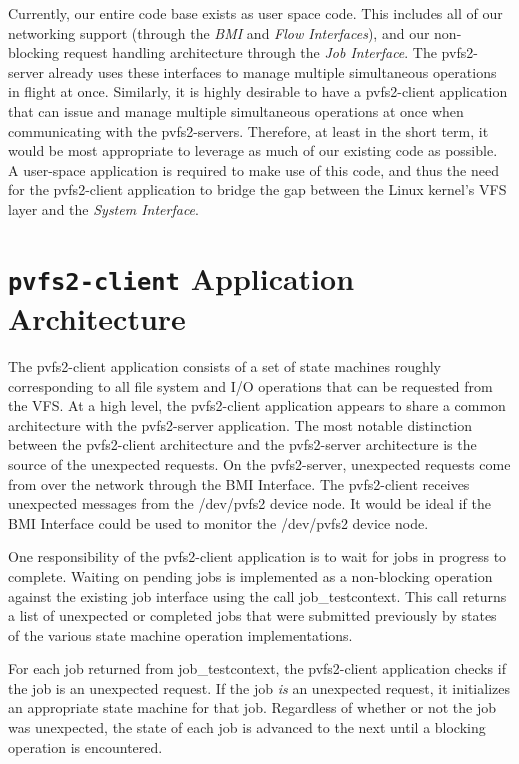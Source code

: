 \documentclass[11pt]{article}
\begin{document}
Currently, our entire code base exists as user space code.  This
includes all of our networking support (through the {\it BMI} and {\it
Flow Interfaces}), and our non-blocking request handling architecture
through the {\it Job Interface}.  The pvfs2-server already uses these
interfaces to manage multiple simultaneous operations in flight at
once.  Similarly, it is highly desirable to have a pvfs2-client
application that can issue and manage multiple simultaneous operations
at once when communicating with the pvfs2-servers.  Therefore, at least
in the short term, it would be most appropriate to leverage as much of
our existing code as possible.  A user-space application is required
to make use of this code, and thus the need for the pvfs2-client
application to bridge the gap between the Linux kernel's VFS layer and
the {\it System Interface}.

\section{\texttt{pvfs2-client} Application Architecture}

The pvfs2-client application consists of a set of state machines
roughly corresponding to all file system and I/O operations that can
be requested from the VFS.  At a high level, the pvfs2-client
application appears to share a common architecture with the
pvfs2-server application.  The most notable distinction between the
pvfs2-client architecture and the pvfs2-server architecture is the
source of the unexpected requests.  On the pvfs2-server, unexpected
requests come from over the network through the BMI Interface.  The
pvfs2-client receives unexpected messages from the /dev/pvfs2 device
node.  It would be ideal if the BMI Interface could be used to monitor
the /dev/pvfs2 device node.

One responsibility of the pvfs2-client application is to wait for jobs
in progress to complete.  Waiting on pending jobs is implemented as a
non-blocking operation against the existing job interface using the
call job\_testcontext.  This call returns a list of unexpected or
completed jobs that were submitted previously by states of the various
state machine operation implementations.

For each job returned from job\_testcontext, the pvfs2-client
application checks if the job is an unexpected request.  If the
job {\it is} an unexpected request, it initializes an appropriate
state machine for that job.  Regardless of whether or not the job was
unexpected, the state of each job is advanced to the next until a
blocking operation is encountered.
\end{document}
